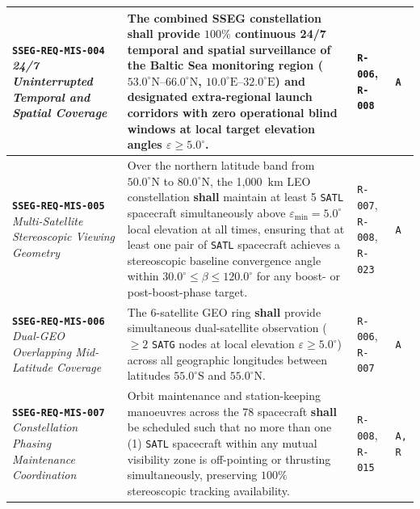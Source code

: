 \documentclass[11pt,a4paper]{article}
\providecommand{\abbr}[1]{#1}
\begin{document}
{\begin{longtable}{|>{\raggedright\arraybackslash}p{}|>{\raggedright\arraybackslash}p{}|>{\raggedright\arraybackslash}p{}|>{\raggedright\arraybackslash}p{}|}
\textbf{\texttt{SSEG-REQ-MIS-004}} \newline \emph{24/7 Uninterrupted Temporal and Spatial Coverage} & The combined \abbr{SSEG} constellation \textbf{shall} provide $100\%$ continuous 24/7 temporal and spatial surveillance of the Baltic Sea monitoring region ($53.0^\circ\text{N}\text{--}66.0^\circ\text{N}$, $10.0^\circ\text{E}\text{--}32.0^\circ\text{E}$) and designated extra-regional launch corridors with zero operational blind windows at local target elevation angles $\varepsilon \ge 5.0^\circ$. & \texttt{R-006}, \newline \texttt{R-008} & \texttt{A} \\ \hline
\textbf{\texttt{SSEG-REQ-MIS-005}} \newline \emph{Multi-Satellite Stereoscopic Viewing Geometry} & Over the northern latitude band from $50.0^\circ\text{N}$ to $80.0^\circ\text{N}$, the 1,000~km \abbr{LEO} constellation \textbf{shall} maintain at least 5 \texttt{SATL} spacecraft simultaneously above $\varepsilon_{\min} = 5.0^\circ$ local elevation at all times, ensuring that at least one pair of \texttt{SATL} spacecraft achieves a stereoscopic baseline convergence angle within $30.0^\circ \le \beta \le 120.0^\circ$ for any boost- or post-boost-phase target. & \texttt{R-007}, \texttt{R-008}, \texttt{R-023} & \texttt{A} \\ \hline
\textbf{\texttt{SSEG-REQ-MIS-006}} \newline \emph{Dual-GEO Overlapping Mid-Latitude Coverage} & The 6-satellite \abbr{GEO} ring \textbf{shall} provide simultaneous dual-satellite observation ($\ge 2$ \texttt{SATG} nodes at local elevation $\varepsilon \ge 5.0^\circ$) across all geographic longitudes between latitudes $55.0^\circ\text{S}$ and $55.0^\circ\text{N}$. & \texttt{R-006}, \newline \texttt{R-007} & \texttt{A} \\ \hline
\textbf{\texttt{SSEG-REQ-MIS-007}} \newline \emph{Constellation Phasing Maintenance Coordination} & Orbit maintenance and station-keeping manoeuvres across the 78 spacecraft \textbf{shall} be scheduled such that no more than one (1) \texttt{SATL} spacecraft within any mutual visibility zone is off-pointing or thrusting simultaneously, preserving $100\%$ stereoscopic tracking availability. & \texttt{R-008}, \newline \texttt{R-015} & \texttt{A, R} \\ \hline
\end{longtable}}
\end{document}
